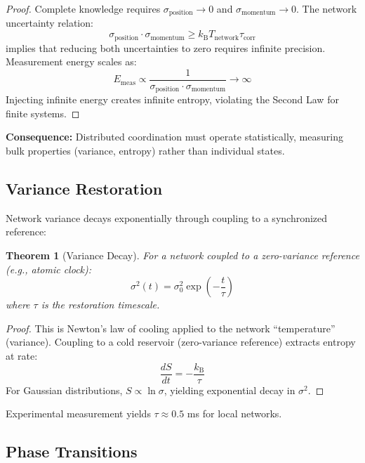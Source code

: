 \documentclass[10pt,twocolumn]{article}
\newtheorem{theorem}{Theorem}[section]
\theoremstyle{definition}
\theoremstyle{remark}
\newcommand{\kB}{k_{\mathrm{B}}}
\begin{document}
\begin{proof}
Complete knowledge requires $\sigma_{\text{position}} \to 0$ and $\sigma_{\text{momentum}} \to 0$. The network uncertainty relation:
\begin{equation}
\sigma_{\text{position}} \cdot \sigma_{\text{momentum}} \geq \kB T_{\text{network}} \tau_{\text{corr}}
\end{equation}
implies that reducing both uncertainties to zero requires infinite precision. Measurement energy scales as:
\begin{equation}
E_{\text{meas}} \propto \frac{1}{\sigma_{\text{position}} \cdot \sigma_{\text{momentum}}} \to \infty
\end{equation}
Injecting infinite energy creates infinite entropy, violating the Second Law for finite systems.
\end{proof}

\textbf{Consequence:} Distributed coordination must operate statistically, measuring bulk properties (variance, entropy) rather than individual states.

\subsection{Variance Restoration}

Network variance decays exponentially through coupling to a synchronized reference:

\begin{theorem}[Variance Decay]
For a network coupled to a zero-variance reference (e.g., atomic clock):
\begin{equation}
\sigma^2(t) = \sigma^2_0 \exp\left(-\frac{t}{\tau}\right)
\end{equation}
where $\tau$ is the restoration timescale.
\end{theorem}

\begin{proof}
This is Newton's law of cooling applied to the network ``temperature'' (variance). Coupling to a cold reservoir (zero-variance reference) extracts entropy at rate:
\begin{equation}
\frac{dS}{dt} = -\frac{\kB}{\tau}
\end{equation}
For Gaussian distributions, $S \propto \ln \sigma$, yielding exponential decay in $\sigma^2$.
\end{proof}

Experimental measurement yields $\tau \approx 0.5$ ms for local networks.

\subsection{Phase Transitions}
\end{document}
